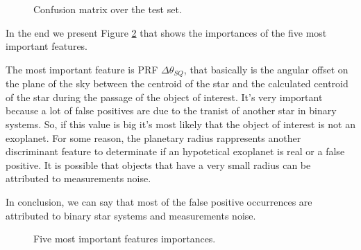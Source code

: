 \documentclass[11pt, a4paper]{article}
\begin{document}
  \begin{figure}
    \centering
    \caption{Confusion matrix over the test set.}
    \label{figure:confusion}
  \end{figure}

  In the end we present Figure \ref{figure:importances} that shows the importances of the five most important features.

  The most important feature is PRF $\Delta\theta_{SQ}$, that basically is the angular offset on the plane of the sky between the centroid of the star and the calculated centroid of the star during the passage of the object of interest.
  It's very important because a lot of false positives are due to the tranist of another star in binary systems.
  So, if this value is big it's most likely that the object of interest is not an exoplanet.
  For some reason, the planetary radius rappresents another discriminant feature to determinate if an hypotetical exoplanet is real or a false positive.
  It is possible that objects that have a very small radius can be attributed to measurements noise.

  In conclusion, we can say that most of the false positive occurrences are attributed to binary star systems and measurements noise.

  \begin{figure}
    \centering
    \caption{Five most important features importances.}
    \label{figure:importances}
  \end{figure}
\end{document}
